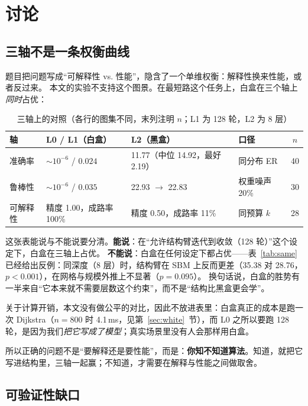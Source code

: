 \section{讨论}\label{sec:discussion}

\subsection{三轴不是一条权衡曲线}

题目把问题写成“可解释性 vs. 性能”，隐含了一个单维权衡：解释性换来性能，或者反过来。
本文的实验不支持这个图景。在最短路这个任务上，白盒在三个轴上\emph{同时}占优：

\begin{table}[H]
\centering
\caption{三轴上的对照（各行的图集不同，末列注明 $n$；L1 为 128 轮，L2 为 8 层）}
\label{tab:three}
\small
\setlength{\tabcolsep}{4pt}
\begin{tabular}{llllc}
\toprule
轴 & L0 / L1（白盒） & L2（黑盒） & 口径 & $n$ \\
\midrule
准确率 & $\sim10^{-6}$ / $0.024$ & 11.77（中位 14.92，最好 2.19） & 同分布 ER & 40 \\
鲁棒性 & $\sim10^{-6}$ / $0.035$ & 22.93 $\to$ 22.83 & 权重噪声 20\% & 30 \\
可解释性 & 精度 1.00，成路率 100\% & 精度 0.50，成路率 11\% & 同预算 $k$ & 28 \\
\bottomrule
\end{tabular}
\end{table}

这张表能说与不能说要分清。\textbf{能说}：在“允许结构臂迭代到收敛（128 轮）”这个设定下，白盒在三轴上占优。
\textbf{不能说}：白盒在任何设定下都占优——表~\ref{tab:same} 已经给出反例：同深度（8 层）时，结构臂在 SBM 上反而更差（35.38 对 28.76，$p<0.001$），在网格与规模外推上不显著（$p=0.095$）。
换句话说，白盒的胜势有一半来自“它本来就不需要层数这个约束”，而不是“结构比黑盒更会学”。

关于计算开销，本文没有做公平的对比，因此不放进表里：白盒真正的成本是跑一次 Dijkstra（$n=800$ 时 4.1\,ms，见第~\ref{sec:white}~节），而 L0 之所以要跑 128 轮，是因为我们\emph{把它写成了模型}；真实场景里没有人会那样用白盒。

所以正确的问题不是“要解释还是要性能”，而是：\textbf{你知不知道算法}。知道，就把它写进结构里，三轴一起赢；不知道，才需要在解释与性能之间做取舍。

\subsection{可验证性缺口}

